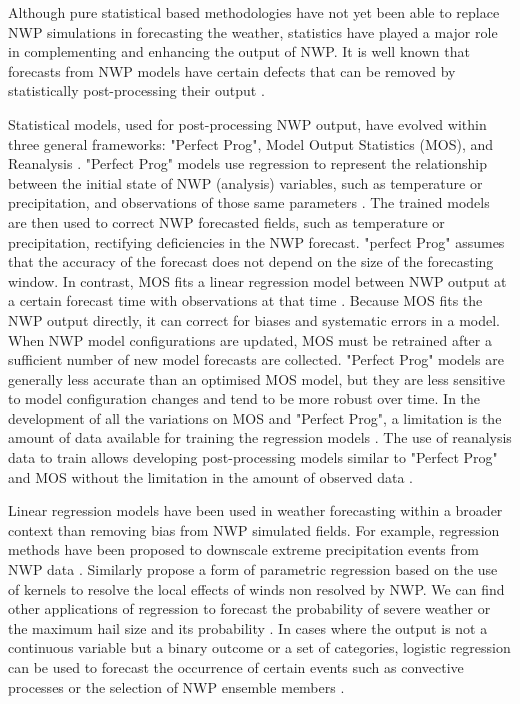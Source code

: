Although pure statistical based methodologies have not yet been able to replace NWP simulations in forecasting the weather, statistics have played a major role in complementing and enhancing the output of NWP. It is well known that forecasts from NWP models have certain defects that can be removed by statistically post-processing their output \citep{wilks1995forecast}. 

\medskip

Statistical models, used for post-processing NWP output, have evolved within three general frameworks: "Perfect Prog", Model Output Statistics (MOS), and Reanalysis \citep{marzban2006mos}. "Perfect Prog" models \citep{vislocky1989use} use regression to represent the relationship between the initial state of NWP (analysis) variables, such as temperature or precipitation, and observations of those same parameters \citep{klein1959objective}. The trained models are then used to correct NWP forecasted fields, such as temperature or precipitation, rectifying deficiencies in the NWP forecast. "perfect Prog" assumes that the accuracy of the forecast does not depend on the size of the forecasting window. In contrast, MOS fits a linear regression model between NWP output at a certain forecast time with observations at that time \citep{glahn1972use}. Because MOS fits the NWP output directly, it can correct for biases and systematic errors in a model. When NWP model configurations are updated, MOS must be retrained after a sufficient number of new model forecasts are collected. "Perfect Prog" models are generally less accurate than an optimised MOS model, but they are less sensitive to model configuration changes and tend to be more robust over time. In the development of all the variations on MOS and "Perfect Prog", a limitation is the amount of data available for training the regression models \citep{mcgovern2017using}. The use of reanalysis data to train allows developing post-processing models similar to "Perfect Prog" and MOS without the limitation in the amount of observed data \citep{kalnay2003atmospheric}.

\medskip

Linear regression models have been used in weather forecasting within a broader context than removing bias from NWP simulated fields. For example, regression methods have been proposed to downscale extreme precipitation events from NWP data \citep{friederichs2007statistical}. Similarly \citep{rozas2014method} propose a form of parametric regression based on the use of kernels to resolve the local effects of winds non resolved by NWP. We can find other applications of regression to forecast the probability of severe weather \citep{kitzmiller1995wsr} or the maximum hail size and its probability \citep{billet1997use}. In cases where the output is not a continuous variable but a binary outcome or a set of categories, logistic regression can be used to forecast the occurrence of certain events such as convective processes \citep{mecikalski2015probabilistic} or the selection of NWP ensemble members \citep{messner2014heteroscedastic}.

